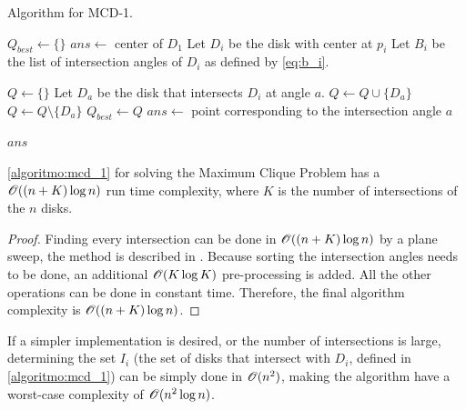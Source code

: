 \begin{algoritmo}
\caption{Algorithm for MCD-1.}\label{algoritmo:mcd_1}
\begin{algorithmic}[1]

\item[]

\State $Q_{best} \gets \{\}$
\State $ans \gets$ center of $D_1$
\State Let $D_i$ be the disk with center at $p_i$
\State Let $B_i$ be the list of intersection angles of $D_i$ as defined by \autoref{eq:b_i}.

\State $Q \gets \{\}$ 
\State Let $D_a$ be the disk that intersects $D_i$ at angle $a$. 
\State $Q \gets Q \cup \{D_a\}$
\Else
\State $Q \gets Q \setminus \{D_a\}$
\EndIf
{} 
\State $Q_{best} \gets Q$
\State $ans \gets $ point corresponding to the intersection angle $a$
\EndIf

\EndFor
\EndFor

\State \Return $ans$
\EndProcedure
\end{algorithmic}
\end{algoritmo}

\begin{teorema}\label{lema:disk}
\autoref{algoritmo:mcd_1} for solving the Maximum Clique Problem has a $\mathscr{O}((n+K)\log{n})$ run time complexity, where $K$ is the number of intersections of the $n$ disks.
\end{teorema}

\begin{proof}
    Finding every intersection can be done in $\mathscr{O}((n+K)\log{n})$  by a plane sweep, the method is described in . 
    Because sorting the intersection angles needs to be done, an additional $\mathscr{O}(K\log{K})$ pre-processing is added. All the other operations can be done in constant time. Therefore, the final algorithm complexity is $\mathscr{O}((n+K)\log{n})$.
\end{proof}

If a simpler implementation is desired, or the number of intersections is large, determining the set $I_i$ (the set of disks that intersect with $D_i$, defined in \autoref{algoritmo:mcd_1}) can be simply done in $\mathscr{O}(n^2)$, making the algorithm have a worst-case complexity of $\mathscr{O}(n^2\log{n})$.


